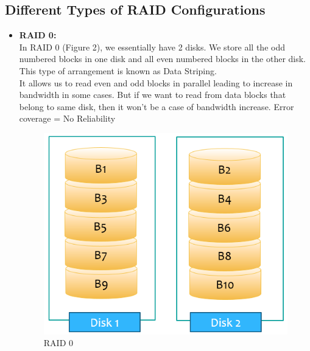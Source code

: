 \documentclass[12pt]{article}
\begin{document}
\subsection{Different Types of RAID Configurations}
\begin{itemize}
    \item \textbf{RAID 0:} \\
    In RAID 0 (Figure 2), we essentially have 2 disks. We store all the odd numbered blocks in one disk and all even numbered blocks in the other disk. This type of arrangement is known as Data Striping. \\
    It allows us to read even and odd blocks in parallel leading to increase in bandwidth in some cases. But if we want to read from data blocks that belong to same disk, then it won't be a case of bandwidth increase.
    Error coverage = No Reliability
    \begin{figure}
        \centering
        \includegraphics{Assignment-14/Raid_0.png}
        \caption{RAID 0}
    \end{figure}
    

\end{itemize}
\end{document}

